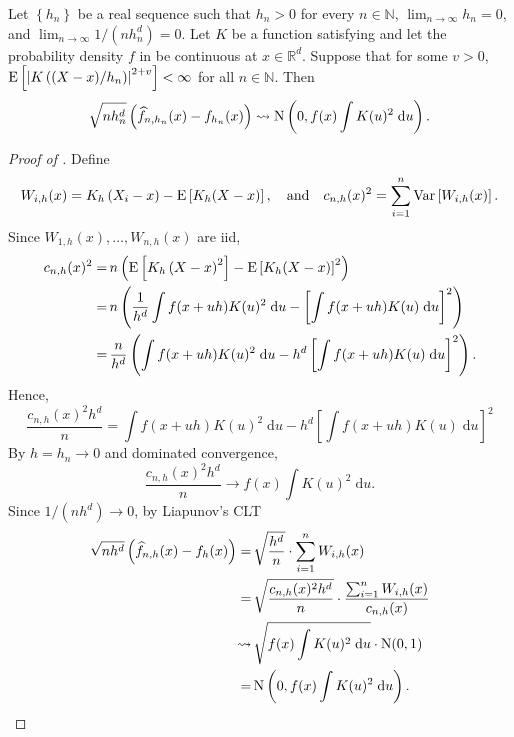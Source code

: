 \begin{theorem}
\label{thm--kde-asymptotic-normality}
Let \(\left\{ h_{n} \right\}\) be a real sequence such that \(h_{n} > 0\) for
every \(n \in \mathbb{N}\), \(\lim_{n \to \infty} h_{n} = 0\), and \(\lim_{n \to
\infty} 1 / \left( n h_{n}^{d} \right) = 0\).
Let \(K\) be a function satisfying  and let the
probability density \(f\) in  be continuous at \(x \in
\mathbb{R}^{d}\).
Suppose that for some \(v > 0\), \(\mathrm{E} \left[ \left| K \left( (X - x) / h_{n}
\right) \right|^{2 + v} \right] < \infty\) for all \(n \in \mathbb{N}\).
Then
\begin{equation*}
  \sqrt{n h_{n}^{d}} \left( \widehat{f}_{n, h_{n}} (x) - f_{h_{n}} (x) \right)
  \rightsquigarrow \mathrm{N} \left( 0, f (x) \int K (u)^{2} \; \mathrm{d} u \right).
\end{equation*}
\end{theorem}

\begin{proof}[Proof of ]
Define
\begin{equation*}
  W_{i, h} (x) = K_{h} \left( X_{i} - x \right) - \mathrm{E} \left[ K_{h} (X - x)
  \right], \quad \text{and} \quad c_{n, h} (x)^{2} = \sum_{i = 1}^{n} \mathrm{Var}
  \left[ W_{i, h} (x) \right].
\end{equation*}
Since \(W_{1, h} (x), \dots, W_{n, h} (x)\) are iid,
\begin{align*}
  c_{n, h} (x)^{2} =
  & \, n \left( \mathrm{E} \left[ K_{h} \left( X - x \right)^{2} \right] - \mathrm{E} \left[
  K_{h} (X - x) \right]^{2} \right) \\
  =
  & \, n \left( \frac{1}{h^{d}} \int f (x + u h) K (u)^{2} \; \mathrm{d} u -
  \left[ \int f (x + u h) K (u) \; \mathrm{d} u \right]^{2} \right) \\
  =
  & \, \frac{n}{h^{d}} \left( \int f (x + u h) K (u)^{2} \; \mathrm{d} u -
  h^{d} \left[ \int f (x + u h) K (u) \; \mathrm{d} u \right]^{2} \right).
\end{align*}
Hence,
\begin{equation*}
  \frac{c_{n, h} (x)^{2} h^{d}}{n} = \int f (x + u h) K (u)^{2} \; \mathrm{d} u
  - h^{d} \left[ \int f (x + u h) K (u) \; \mathrm{d} u \right]^{2}
\end{equation*}
By \(h = h_{n} \to 0\) and dominated convergence,
\begin{equation*}
  \frac{c_{n, h} (x)^{2} h^{d}}{n} \to f (x) \int K (u)^{2} \; \mathrm{d} u.
\end{equation*}
Since \(1 / \left( n h^{d} \right) \to 0\), by Liapunov's CLT
\begin{align*}
  \sqrt{n h^{d}} \left( \widehat{f}_{n, h} (x) - f_{h} (x) \right) =
  & \, \sqrt{\frac{h^{d}}{n}} \cdot \sum_{i = 1}^{n} W_{i, h} (x) \\
  =
  & \, \sqrt{\frac{c_{n, h} (x)^{2} h^{d}}{n}} \cdot \frac{\sum_{i = 1}^{n}
  W_{i, h} (x)}{c_{n, h} (x)} \\
  \rightsquigarrow
  & \, \sqrt{f (x) \int K (u)^{2} \; \mathrm{d} u} \cdot \mathrm{N} (0, 1) \\
  =
  & \, \mathrm{N} \left( 0, f (x) \int K (u)^{2} \; \mathrm{d} u \right).
\end{align*}
\end{proof}

